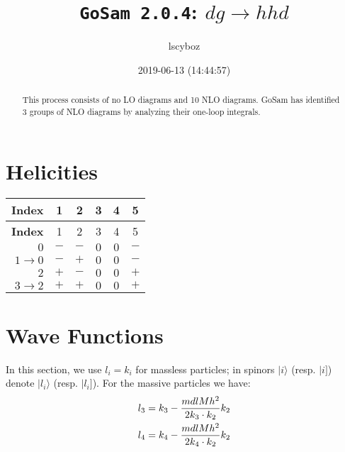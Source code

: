 \documentclass[a4paper]{article}
\title{\texttt{GoSam 2.0.4}: ${d}{g}\rightarrow{h}{h}{d}$}
\author{lscyboz}
\date{2019-06-13 (14:44:57)}
\newcommand{\kea}[1]{\vert #1 \rangle}
\newcommand{\keb}[1]{\vert #1 ]}
\begin{document}
\maketitle
\begin{abstract}
\noindent This process consists of no LO diagrams and 10 NLO diagrams. GoSam has identified 3 groups  of NLO diagrams by analyzing their one-loop integrals.
\end{abstract}
\newpage
\tableofcontents
\newpage

\section{Helicities}

\begin{longtable}[c]{r|ccccc}
\bf{Index} &1&2&3&4&5\\
\hline
\endfirsthead
\bf{Index} &1&2&3&4&5\\
\hline
\endhead 
$0$& $-$& $-$& $0$& $0$& $-$\\
$1\rightarrow 0$& $-$& $+$& $0$& $0$& $-$\\
$2$& $+$& $-$& $0$& $0$& $+$\\
$3\rightarrow 2$& $+$& $+$& $0$& $0$& $+$\\
\end{longtable}
\section{Wave Functions}
In this section, we use $l_i=k_i$ for massless particles;
in spinors $\kea{i}$ (resp. $\keb{i}$) denote $\kea{l_i}$ (resp. $\keb{l_i}$).
For the massive particles we have:
\begin{align}
l_{3} &= k_{3} - \frac{mdlMh^2}{%
      2 k_{3}\cdot k_{2}}k_{2}\\
l_{4} &= k_{4} - \frac{mdlMh^2}{%
      2 k_{4}\cdot k_{2}}k_{2}
\end{align}
\end{document}
